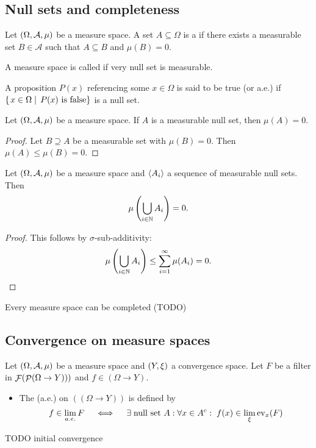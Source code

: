 \subsection{Null sets and completeness}
\begin{definition}
Let $\left( \Omega, \mathcal{A}, \mu \right)$ be a measure space. A set $A\subseteq \Omega$ is a  if there exists a measurable set $B\in\mathcal{A}$ such that $A\subseteq B$ and $\mu(B) = 0$.

A measure space is called  if very null set is
measurable.

A proposition $P(x)$ referencing some $x\in\Omega$ is said to be true  (or a.e.) if $\left\{\left. x\in\Omega \;\right|\; \text{$P(x)$ is false} \right\}$ is a null set.
\end{definition}

\begin{lemma}
Let $\left( \Omega, \mathcal{A}, \mu \right)$ be a measure space. If $A$ is a measurable null set, then $\mu(A) = 0$.
\end{lemma}
\begin{proof}
Let $B\supseteq A$ be a measurable set with $\mu(B) = 0$. Then $\mu(A) \leq \mu(B) = 0$.
\end{proof}

\begin{lemma}
Let $\left( \Omega, \mathcal{A}, \mu \right)$ be a measure space and $\left\langle A_i \right\rangle$ a sequence of measurable null sets. Then
\[ \mu\left(\bigcup_{i\in\mathbb{N}}A_i\right) = 0. \]
\end{lemma}
\begin{proof}
This follows by $\sigma$-sub-additivity:
\[ \mu\left(\bigcup_{i\in\mathbb{N}}A_i\right) \leq \sum_{i=1}^\infty \mu(A_i) = 0. \]
\end{proof}

\begin{proposition}
Every measure space can be completed (TODO)
\end{proposition}

\subsection{Convergence on measure spaces}
\begin{definition}
Let $\left( \Omega, \mathcal{A}, \mu \right)$ be a measure space and $\left( Y,\xi \right)$ a convergence space. Let $F$ be a filter in $\mathop{\mathcal{F}}(\mathop{\mathcal{P}}(\Omega\to Y)))$ and $f\in (\Omega\to Y)$.
\begin{itemize}
\item The  (a.e.) on $((\Omega\to Y))$ is defined by
\[ f\in \lim_{a.e.} F \quad\iff\quad \exists \;\text{null set $A$}: \forall x\in A^c: \; f(x) \in \lim_\xi \operatorname{ev}_x(F) \]
\end{itemize}
\end{definition}
TODO initial convergence

